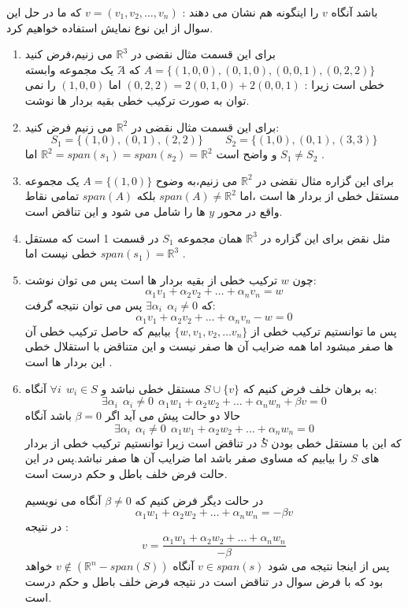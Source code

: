 \documentclass{article}
\begin{document}
باشد آنگاه 
$v$
را اینگونه هم نشان می دهند :
$v=(v_1,v_2,\ldots,v_n)$
که ما در حل این سوال از این نوع نمایش استفاده خواهیم کرد.
\begin{enumerate}

\item
 برای این قسمت مثال نقضی در 
$\mathbb{R}^3$
می زنیم،فرض کنید 
$A=\{(1,0,0),(0,1,0),(0,0,1),(0,2,2)\}$	
که $َA$ یک مجموعه وابسته خطی است زیرا :
$(0,2,2)=2(0,1,0)+2(0,0,1)$
اما 
$(1,0,0)$
را نمی توان به صورت ترکیب خطی بقیه بردار ها نوشت.
 \item 
 برای این قسمت مثال نقضی در 
 $\mathbb{R}^2$
 می زنیم فرض کنید:
 $$S_1=\{(1,0),(0,1),(2,2)\}\qquad S_2=\{(1,0),(0,1),(3,3)\}$$
 و واضح است 
 $\mathbb{R}^2=span(s_1)=span(s_2)=\mathbb{R}^2$
 اما 
 $S_1\neq S_2$
 .
 \item 
 برای این گزاره مثال نقضی در 
 $\mathbb{R}^2$
 می زنیم،به وضوح 
 $A=\{(1,0)\}$
 یک مجموعه مستقل خطی از بردار ها است ،اما 
 $span(A)\neq \mathbb{R}^2$
 بلکه 
 $span(A)$
 تمامی نقاط واقع در محور $y$ ها را شامل می شود و این تناقض است.
 \item 
 مثل نقض برای این گزاره  در
 $\mathbb{R}^3$
 همان مجموعه 
 $S_1$
 در قسمت 1 است که مستقل خطی نیست اما 
 $span(s_1)=\mathbb{R}^3$
 .
 \item
 چون 
 $w$
 ترکیب خطی از بقیه بردار ها است پس می توان نوشت:
 $$\alpha_1v_1+\alpha_2v_2+\ldots+\alpha_nv_n=w $$
 که 
$\exists \alpha_i \ \ \alpha_i\neq0$
پس می توان نتیجه گرفت:
$$\alpha_1v_1+\alpha_2v_2+\ldots+\alpha_nv_n-w=0$$ 
پس ما توانستیم ترکیب خطی از 
$\{w,v_1,v_2,\ldots v_n\}$
بیابیم که حاصل ترکیب خطی آن ها صفر مبشود اما همه ضرایب آن ها صفر نیست و این متناقض با استقلال خطی این بردار ها است . 
\item 
به برهان خلف فرض کنیم که 
$S\cup \{v\}$
مستقل خطی نباشد و 
$\forall i \ \ w_i\in S$
آنگاه:
$$\exists \alpha_i \ \ \alpha_i\neq0 \ \ \alpha_1w_1+\alpha_2w_2+\ldots+\alpha_nw_n+\beta v=0$$
حالا دو حالت پیش می آید اگر 
$\beta=0$
باشد آنگاه 
$$\exists \alpha_i \ \ \alpha_i\neq0 \ \ \alpha_1w_1+\alpha_2w_2+\ldots+\alpha_nw_n=0$$
که این با مستقل خطی بودن $ُS$ در تناقض است زیرا توانستیم ترکیب خطی از بردار های $S$ را بیابیم که مساوی صفر باشد اما ضرایب آن ها صفر نباشد.پس در این حالت فرض خلف باطل و حکم درست است.

در حالت دیگر فرض کنیم که 
$\beta\neq0$
آنگاه می نویسیم 
$$ \alpha_1w_1+\alpha_2w_2+\ldots+\alpha_nw_n=-\beta v$$
در نتیجه :
$$v=\frac{\alpha_1w_1+\alpha_2w_2+\ldots+\alpha_nw_n}{-\beta}$$
پس از اینجا نتیجه می شود 
$v\in span(s)$
آنگاه 
$v\notin(\mathbb{R}^n-span(S))$
خواهد بود که با فرض سوال در تناقض است در نتیجه فرض خلف باطل و حکم درست است.
\end{enumerate}
\end{document}
